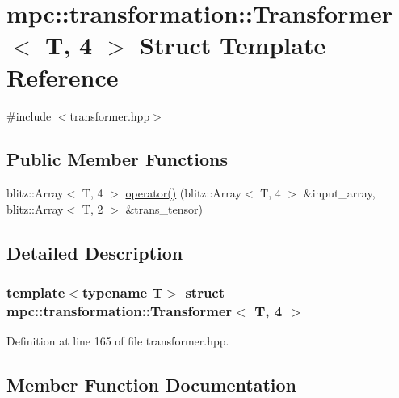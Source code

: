 \hypertarget{structmpc_1_1transformation_1_1_transformer_3_01_t_00_014_01_4}{}\section{mpc\+:\+:transformation\+:\+:Transformer$<$ T, 4 $>$ Struct Template Reference}
\label{structmpc_1_1transformation_1_1_transformer_3_01_t_00_014_01_4}


{\ttfamily \#include $<$transformer.\+hpp$>$}

\subsection*{Public Member Functions}
\begin{DoxyCompactItemize}
\item 
blitz\+::\+Array$<$ T, 4 $>$ \mbox{\hyperlink{structmpc_1_1transformation_1_1_transformer_3_01_t_00_014_01_4_a2d0aaaa01ea4be420abb271b8652e2c9}{operator()}} (blitz\+::\+Array$<$ T, 4 $>$ \&input\+\_\+array, blitz\+::\+Array$<$ T, 2 $>$ \&trans\+\_\+tensor)
\end{DoxyCompactItemize}


\subsection{Detailed Description}
\subsubsection*{template$<$typename T$>$\newline
struct mpc\+::transformation\+::\+Transformer$<$ T, 4 $>$}



Definition at line 165 of file transformer.\+hpp.



\subsection{Member Function Documentation}
\mbox{\label{structmpc_1_1transformation_1_1_transformer_3_01_t_00_014_01_4_a2d0aaaa01ea4be420abb271b8652e2c9}} 
